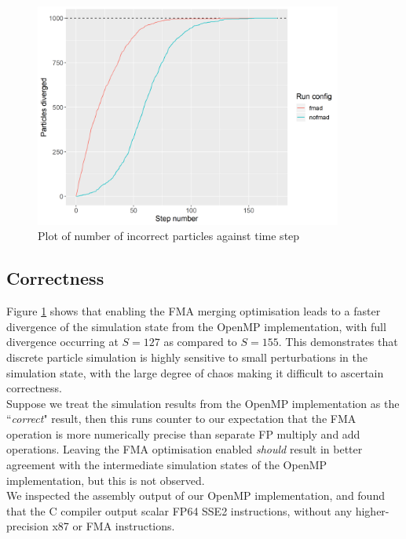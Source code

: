 \documentclass[12pt]{article}
\begin{document}
\begin{figure}[H]
    \centering
    \includegraphics[width=0.9\textwidth]{divergedParticles}
    \caption{Plot of number of incorrect particles against time step}
    \label{fig:divergedParticles}
\end{figure}

\subsection{Correctness}

Figure \ref{fig:divergedParticles} shows that enabling the FMA merging optimisation leads to a faster divergence of the simulation state from the OpenMP implementation, with full divergence occurring at $S=127$ as compared to $S=155$. This demonstrates that discrete particle simulation is highly sensitive to small perturbations in the simulation state, with the large degree of chaos making it difficult to ascertain correctness.\\

Suppose we treat the simulation results from the OpenMP implementation as the ``\textit{correct}" result, then this runs counter to our expectation that the FMA operation is more numerically precise than separate FP multiply and add operations. Leaving the FMA optimisation enabled \textit{should} result in better agreement with the intermediate simulation states of the OpenMP implementation, but this is not observed.\\

We inspected the assembly output of our OpenMP implementation, and found that the C compiler output scalar FP64 SSE2 instructions, without any higher-precision x87 or FMA instructions.\\
\end{document}
